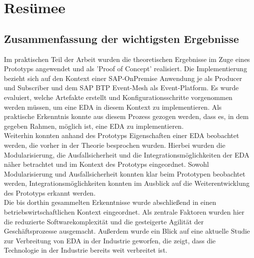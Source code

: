 \section{Resümee}
\subsection{Zusammenfassung der wichtigsten Ergebnisse}
Im praktischen Teil der Arbeit wurden die theoretischen Ergebnisse im Zuge eines Prototyps angewendet und als 'Proof of Concept' realisiert. Die Implementierung bezieht sich auf den Kontext einer SAP-OnPremise Anwendung je als Producer und Subscriber und dem SAP BTP Event-Mesh als Event-Platform. Es wurde evaluiert, welche Artefakte erstellt und Konfigurationsschritte vorgenommen werden müssen, um eine \ac{EDA} in diesem Kontext zu implementieren. Als praktische Erkenntnis konnte aus diesem Prozess gezogen werden, dass es, in dem gegeben Rahmen, möglich ist, eine \ac{EDA} zu implementieren. \\
Weiterhin konnten anhand des Prototyps Eigenschaften einer \ac{EDA} beobachtet werden, die vorher in der Theorie besprochen wurden. Hierbei wurden die Modularisierung, die Ausfallsicherheit und die Integrationsmöglichkeiten der \ac{EDA} näher betrachtet und im Kontext des Prototyps eingeordnet. Sowohl Modularisierung und Ausfallsicherheit konnten klar beim Prototypen beobachtet werden, Integrationsmöglichkeiten konnten im Ausblick auf die Weiterentwicklung des Prototyps erkannt werden. \\
Die bis dorthin gesammelten Erkenntnisse wurde abschließend in einen betriebswirtschaftlichen Kontext eingeordnet. Als zentrale Faktoren wurden hier die reduzierte Softwarekomplexität und die gesteigerte Agilität der Geschäftsprozesse ausgemacht. Außerdem wurde ein Blick auf eine aktuelle Studie zur Verbreitung von \ac{EDA} in der Industrie geworfen, die zeigt, dass die Technologie in der Industrie bereits weit verbreitet ist.

